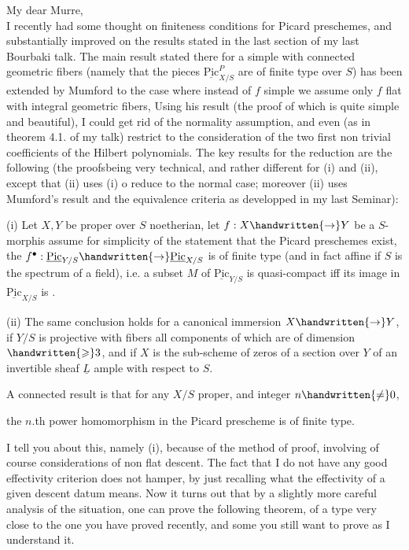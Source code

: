 My dear Murre,\\

I recently had some thought on finiteness conditions for Picard preschemes, and substantially improved on the results stated in the last section of my last Bourbaki talk. The main result stated there for a simple  with connected geometric fibers (namely that the pieces $\underline{\mathrm{Pic}}^{P}_{X/S}$ are of finite type over $S$) has been extended by Mumford to the case where  instead of $f$ simple we assume only $f$ flat with integral geometric fibers, Using his result (the proof of which is quite simple and beautiful), I could get rid of the normality assumption, and even (as in theorem 4.1. of my talk) restrict to the consideration of the two first non trivial coefficients of the Hilbert polynomials. The key results for the reduction are the following (the proofsbeing very technical, and rather different for (i) and (ii), except that (ii) uses (i) o reduce to the normal case; moreover (ii) uses Mumford's result and the equivalence criteria as developped in my last Seminar):

(i) Let $X,Y$ be proper over $S$ noetherian, let $f:X\handwritten{\to}Y$ be a  $S$-morphis  assume for simplicity of the statement that the Picard preschemes exist, the $f^{\bullet}:\underline{\mathrm{Pic}}_{Y/S}\handwritten{\to}\underline{\mathrm{Pic}}_{X/S}$ is of finite type (and in fact affine if $S$ is the spectrum of a field), i.e. a subset $M$ of $\underline{\mathrm{Pic}}_{Y/S}$ is quasi-compact iff its image in $\underline{\mathrm{Pic}}_{X/S}$ is .

(ii) The same conclusion holds for a canonical immersion $X\handwritten{\to}Y$, if $Y/S$ is projective with fibers all components of which are of dimension $\handwritten{\geqslant}3$, and if $X$ is the sub-scheme of zeros of a section over $Y$ of an invertible sheaf $\underline{L}$ ample with respect to $S$.

A connected result is that for any $X/S$ proper, and integer $n\handwritten{\ne}0$,

the $n$.th power homomorphism in the Picard prescheme is of finite type.

I tell you about this, namely (i), because of the method of proof, involving of course considerations of non flat descent. The fact that I do not have any good effectivity criterion does not hamper, by just recalling what the effectivity of a given descent datum means.  Now it turns out that by a slightly more careful analysis of the situation, one can prove the following theorem, of a type very close to the one you have proved recently, and  some you still want to prove as I understand it\deleted{\unsure{:}}.

